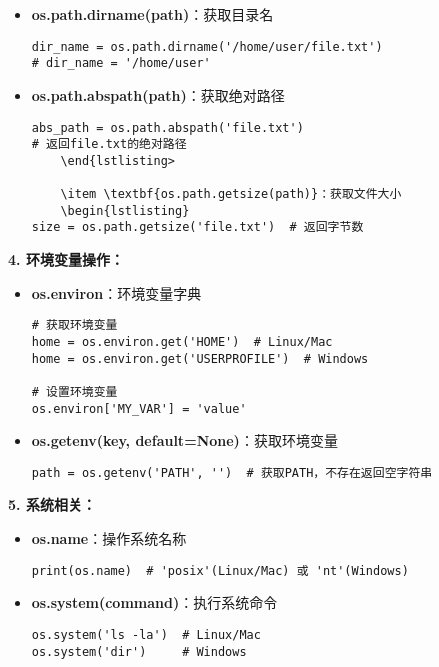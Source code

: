 \begin{mdframed}
\begin{itemize}
    \item \textbf{os.path.dirname(path)}：获取目录名
    \begin{lstlisting}
dir_name = os.path.dirname('/home/user/file.txt')
# dir_name = '/home/user'
    \end{lstlisting}

    \item \textbf{os.path.abspath(path)}：获取绝对路径
    \begin{lstlisting}
abs_path = os.path.abspath('file.txt')
# 返回file.txt的绝对路径
    \end{lstlisting>

    \item \textbf{os.path.getsize(path)}：获取文件大小
    \begin{lstlisting}
size = os.path.getsize('file.txt')  # 返回字节数
    \end{lstlisting}
  \end{itemize}

  \textbf{4. 环境变量操作：}
  \begin{itemize}
    \item \textbf{os.environ}：环境变量字典
    \begin{lstlisting}
# 获取环境变量
home = os.environ.get('HOME')  # Linux/Mac
home = os.environ.get('USERPROFILE')  # Windows

# 设置环境变量
os.environ['MY_VAR'] = 'value'
    \end{lstlisting}

    \item \textbf{os.getenv(key, default=None)}：获取环境变量
    \begin{lstlisting}
path = os.getenv('PATH', '')  # 获取PATH，不存在返回空字符串
    \end{lstlisting}
  \end{itemize}

  \textbf{5. 系统相关：}
  \begin{itemize}
    \item \textbf{os.name}：操作系统名称
    \begin{lstlisting}
print(os.name)  # 'posix'(Linux/Mac) 或 'nt'(Windows)
    \end{lstlisting}

    \item \textbf{os.system(command)}：执行系统命令
    \begin{lstlisting}
os.system('ls -la')  # Linux/Mac
os.system('dir')     # Windows
    \end{lstlisting}


\end{itemize}
\end{mdframed}
